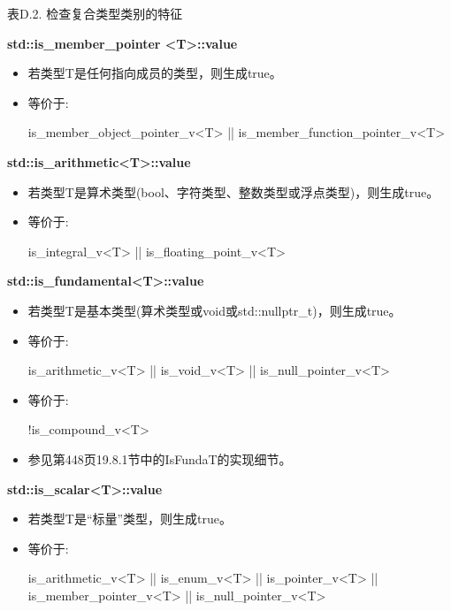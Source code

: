 \begin{center}
表D.2. 检查复合类型类别的特征
\end{center}

\textbf{std::is\_member\_pointer <T>::value}

\begin{itemize}
\item 
若类型T是任何指向成员的类型，则生成true。

\item 
等价于: 
\begin{cpp}
is_member_object_pointer_v<T> || is_member_function_pointer_v<T>
\end{cpp}
\end{itemize}

\textbf{std::is\_arithmetic<T>::value}

\begin{itemize}
\item 
若类型T是算术类型(bool、字符类型、整数类型或浮点类型)，则生成true。

\item 
等价于: 
\begin{cpp}
is_integral_v<T> || is_floating_point_v<T>
\end{cpp}
\end{itemize}

\textbf{std::is\_fundamental<T>::value}

\begin{itemize}
\item 
若类型T是基本类型(算术类型或void或std::nullptr\_t)，则生成true。

\item 
等价于: 
\begin{cpp}
is_arithmetic_v<T> || is_void_v<T> || is_null_pointer_v<T>
\end{cpp}

\item 
等价于: 
\begin{cpp}
!is_compound_v<T>
\end{cpp}

\item 
参见第448页19.8.1节中的IsFundaT的实现细节。
\end{itemize}

\textbf{std::is\_scalar<T>::value}

\begin{itemize}
\item 
若类型T是“标量”类型，则生成true。

\item 
等价于:  
\begin{cpp}
is_arithmetic_v<T> || is_enum_v<T> || is_pointer_v<T>
|| is_member_pointer_v<T> || is_null_pointer_v<T>
\end{cpp}
\end{itemize}

